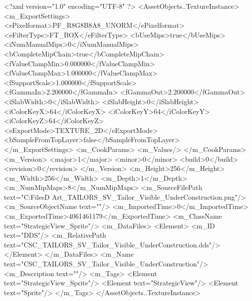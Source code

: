 <?xml version="1.0" encoding="UTF-8" ?>
<AssetObjects..TextureInstance>
	<m_ExportSettings>
		<ePixelformat>PF_R8G8B8A8_UNORM</ePixelformat>
		<eFilterType>FT_BOX</eFilterType>
		<bUseMips>true</bUseMips>
		<iNumManualMips>0</iNumManualMips>
		<bCompleteMipChain>true</bCompleteMipChain>
		<fValueClampMin>0.000000</fValueClampMin>
		<fValueClampMax>1.000000</fValueClampMax>
		<fSupportScale>1.000000</fSupportScale>
		<fGammaIn>2.200000</fGammaIn>
		<fGammaOut>2.200000</fGammaOut>
		<iSlabWidth>0</iSlabWidth>
		<iSlabHeight>0</iSlabHeight>
		<iColorKeyX>64</iColorKeyX>
		<iColorKeyY>64</iColorKeyY>
		<iColorKeyZ>64</iColorKeyZ>
		<eExportMode>TEXTURE_2D</eExportMode>
		<bSampleFromTopLayer>false</bSampleFromTopLayer>
	</m_ExportSettings>
	<m_CookParams>
		<m_Values/>
	</m_CookParams>
	<m_Version>
		<major>1</major>
		<minor>0</minor>
		<build>0</build>
		<revision>0</revision>
	</m_Version>
	<m_Height>256</m_Height>
	<m_Width>256</m_Width>
	<m_Depth>1</m_Depth>
	<m_NumMipMaps>8</m_NumMipMaps>
	<m_SourceFilePath text="C:\Users\Shadow\Desktop\Working Files\2D Art\Quarters\Tailors\StrategicView\CSC_TAILORS_SV_Tailor_Visible_UnderConstruction.png"/>
	<m_SourceObjectName text=""/>
	<m_ImportedTime>0</m_ImportedTime>
	<m_ExportedTime>4061461179</m_ExportedTime>
	<m_ClassName text="StrategicView_Sprite"/>
	<m_DataFiles>
		<Element>
			<m_ID text="DDS"/>
			<m_RelativePath text="CSC_TAILORS_SV_Tailor_Visible_UnderConstruction.dds"/>
		</Element>
	</m_DataFiles>
	<m_Name text="CSC_TAILORS_SV_Tailor_Visible_UnderConstruction"/>
	<m_Description text=""/>
	<m_Tags>
		<Element text="StrategicView_Sprite"/>
		<Element text="StrategicView"/>
		<Element text="Sprite"/>
	</m_Tags>
</AssetObjects..TextureInstance>


